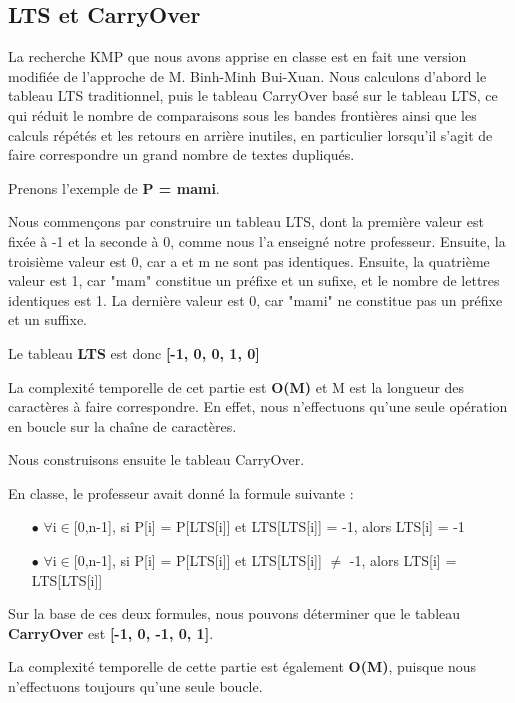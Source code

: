 \documentclass[11pt,english]{article}
\begin{document}
\subsection{LTS et CarryOver}

\indent 

La recherche KMP que nous avons apprise en classe est en fait une version modifiée de l'approche de M. Binh-Minh Bui-Xuan. Nous calculons d'abord le tableau LTS traditionnel, puis le tableau CarryOver basé sur le tableau LTS, ce qui réduit le nombre de comparaisons sous les bandes frontières ainsi que les calculs répétés et les retours en arrière inutiles, en particulier lorsqu'il s'agit de faire correspondre un grand nombre de textes dupliqués.

\indent Prenons l'exemple de \textbf{P = mami}.

\indent Nous commençons par construire un tableau LTS, dont la première valeur est fixée à -1 et la seconde à 0, comme nous l'a enseigné notre professeur.
Ensuite, la troisième valeur est 0, car a et m ne sont pas identiques.
Ensuite, la quatrième valeur est 1, car "mam" constitue un préfixe et un sufixe, et le nombre de lettres identiques est 1.
La dernière valeur est 0, car "mami" ne constitue pas un préfixe et un suffixe.

\indent Le tableau \textbf{LTS} est donc \textbf{[-1, 0, 0, 1, 0]} 

\indent La complexité temporelle de cet partie est \textbf{O(M)} et M est la longueur des caractères à faire correspondre.
En effet, nous n'effectuons qu'une seule opération en boucle sur la chaîne de caractères.

\indent Nous construisons ensuite le tableau CarryOver.

\indent En classe, le professeur avait donné la formule suivante :

\begin{itemize}
    \item [$\bullet$] $\forall$i$\in$[0,n-1], si P[i] = P[LTS[i]] et LTS[LTS[i]] = -1, alors LTS[i] = -1 
    \item [$\bullet$] $\forall$i$\in$[0,n-1], si P[i] = P[LTS[i]] et LTS[LTS[i]] $\neq$ -1, alors LTS[i] = LTS[LTS[i]]
\end{itemize}

\indent Sur la base de ces deux formules, nous pouvons déterminer que le tableau \textbf{CarryOver} est \textbf{[-1, 0, -1, 0, 1]}.

\indent La complexité temporelle de cette partie est également \textbf{O(M)}, puisque nous n'effectuons toujours qu'une seule boucle.
\end{document}
